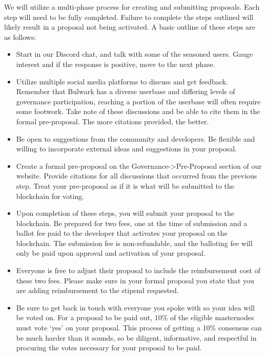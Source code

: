 \documentclass[11pt,a4paperpaper,]{report}
\providecommand{\tightlist}{%
  \setlength{\itemsep}{0pt}\setlength{\parskip}{0pt}}
\begin{document}
We will utilize a multi-phase process for creating and submitting
proposals. Each step will need to be fully completed. Failure to
complete the steps outlined will likely result in a proposal not being
activated. A basic outline of these steps are as follows:

\begin{itemize}
\tightlist
\item
  Start in our Discord chat, and talk with some of the seasoned users.
  Gauge interest and if the response is positive, move to the next
  phase.
\item
  Utilize multiple social media platforms to discuss and get feedback.
  Remember that Bulwark has a diverse userbase and differing levels of
  governance participation, reaching a portion of the userbase will
  often require some footwork. Take note of these discussions and be
  able to cite them in the formal pre-proposal. The more citations
  provided, the better.
\item
  Be open to suggestions from the community and developers. Be flexible
  and willing to incorporate external ideas and suggestions in your
  proposal.
\item
  Create a formal pre-proposal on the
  Governance-\textgreater{}Pre-Proposal section of our website. Provide
  citations for all discussions that occurred from the previous step.
  Treat your pre-proposal as if it is what will be submitted to the
  blockchain for voting.
\item
  Upon completion of these steps, you will submit your proposal to the
  blockchain. Be prepared for two fees, one at the time of submission
  and a ballot fee paid to the developer that activates your proposal on
  the blockchain. The submission fee is non-refundable, and the
  balloting fee will only be paid upon approval and activation of your
  proposal.
\item
  Everyone is free to adjust their proposal to include the reimbursement
  cost of these two fees. Please make sure in your formal proposal you
  state that you are adding reimbursement to the stipend requested.
\item
  Be sure to get back in touch with everyone you spoke with so your idea
  will be voted on. For a proposal to be paid out, 10\% of the eligible
  masternodes must vote `yes' on your proposal. This process of getting
  a 10\% consensus can be much harder than it sounds, so be diligent,
  informative, and respectful in procuring the votes necessary for your
  proposal to be paid.
\end{itemize}
\end{document}
